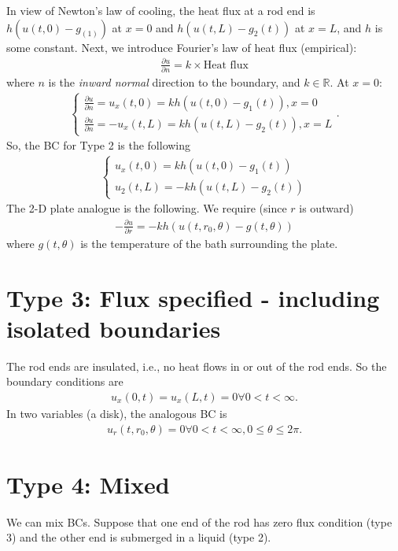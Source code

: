 \documentclass{book}
\theoremstyle{definition}
\newcommand{\p}{\partial}
\newcommand{\R}{\mathbb{R}}
\begin{document}
In view of Newton's law of cooling, the heat flux at a rod end is $h(u(t,0) - g_(1))$ at $x=0$ and $h(u(t,L)-g_2(t))$ at $x=L$, and $h$ is some constant. Next, we introduce Fourier's law of heat flux (empirical):
\begin{align*}
\frac{\p u}{\p n} = k \times\text{Heat flux}
\end{align*}
where $n$ is the \textit{inward normal} direction to the boundary, and $k\in\R$. At $x=0$:
\begin{align*}
\begin{cases*}
\frac{\p u}{\p n} = u_x(t,0) = kh(u(t,0)-g_1(t)), x=0\\
\frac{\p u}{\p n} = -u_x(t,L) = kh(u(t,L)-g_2(t)), x=L
\end{cases*}.
\end{align*}
So, the BC for Type 2 is the following
\begin{align*}
\begin{cases*}
u_x(t,0) = kh(u(t,0) - g_1(t))\\
u_2(t,L) = -kh(u(t,L) - g_2(t))
\end{cases*}
\end{align*}
The 2-D plate analogue is the following. We require (since $r$ is outward)
\begin{align*}
-\frac{\p u}{\p r} = -kh(u(t,r_0,\theta) - g(t,\theta))
\end{align*}
where $g(t,\theta)$ is the temperature of the bath surrounding the plate. 


\section{Type 3: Flux specified - including isolated boundaries} 
The rod ends are insulated, i.e., no heat flows in or out of the rod ends. So the boundary conditions are
\begin{align*}
u_x(0,t) = u_x(L,t) = 0 \forall 0 < t < \infty.
\end{align*}
In two variables (a disk), the analogous BC is
\begin{align*}
u_r(t,r_0,\theta) = 0 \forall 0 < t < \infty, 0\leq \theta \leq 2\pi.
\end{align*}
\section{Type 4: Mixed}
We can mix BCs. Suppose that one end of the rod has zero flux condition (type 3) and the other end is submerged in a liquid (type 2).
\end{document}
